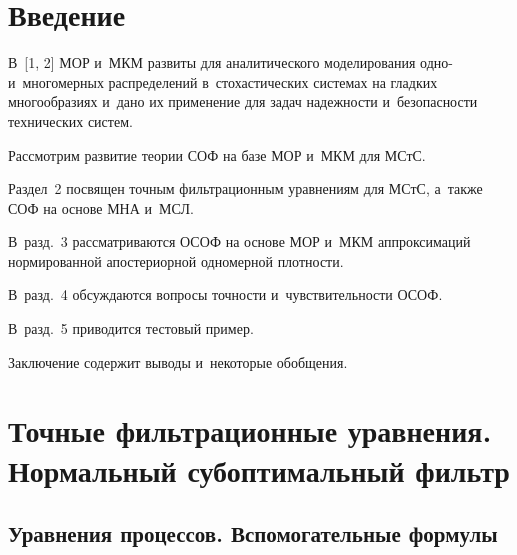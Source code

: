 

\vspace*{12pt}


\thispagestyle{headings}

\begin{multicols}{2}

\label{st\stat}

\section{Введение}

В~[1, 2] МОР и~МКМ развиты для аналитического моделирования одно- и~многомерных
распределений в~стохастических системах  на гладких многообразиях
и~дано их применение для задач надежности и~безопасности
технических систем.

Рассмотрим развитие теории СОФ на базе МОР 
и~МКМ для МСтС. 

Раздел~2 посвящен точным  фильтрационным уравнениям для МСтС, 
а~также СОФ на основе МНА и~МСЛ. 

В~разд.~3 рассматриваются ОСОФ на основе МОР 
и~МКМ аппроксимаций нормированной  апостериорной одномерной плотности. 

В~разд.~4 обсуждаются вопросы точности и~чувствительности ОСОФ. 

В~разд.~5 
приводится тестовый пример. 

Заключение содержит выводы и~некоторые обобщения.

\section{Точные фильтрационные уравнения. Нормальный субоптимальный фильтр}

\subsection{Уравнения процессов. Вспомогательные формулы}


\end{multicols}
